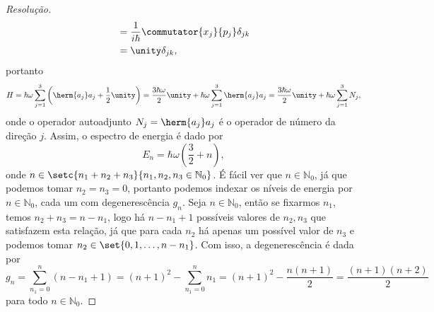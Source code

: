 \begin{proof}[Resolução]
\begin{align*}
                                     &= \frac{1}{i\hbar} \commutator{x_j}{p_j} \delta_{jk}\\
                                     &= \unity \delta_{jk},
    \end{align*}
    portanto
    \begin{equation*}
        H = \hbar \omega \sum_{j= 1}^3 \left(\herm{a_j}a_j + \frac12 \unity\right) = \frac{3 \hbar \omega}{2} \unity + \hbar \omega \sum_{j= 1}^3 \herm{a_j}a_j = \frac{3\hbar \omega}{2} \unity + \hbar\omega \sum_{j= 1}^3 N_j,
    \end{equation*}
    onde o operador autoadjunto \(N_j = \herm{a_j}a_j\) é o operador de número da direção \(j\). Assim, o espectro de energia é dado por
    \begin{equation*}
        E_n = \hbar \omega \left(\frac32 + n\right),
    \end{equation*}
    onde \(n \in \setc{n_1 + n_2 + n_3}{n_1, n_2, n_3 \in \mathbb{N}_0}\). É fácil ver que \(n \in \mathbb{N}_0\), já que podemos tomar \(n_2 = n_3 = 0\), portanto podemos indexar os níveis de energia por \(n \in \mathbb{N}_0\), cada um com degenerescência \(g_n\). Seja \(n \in \mathbb{N}_0\), então se fixarmos \(n_1\), temos \(n_2 + n_3 = n - n_1\), logo há \(n - n_1 + 1\) possíveis valores de \(n_2, n_3\) que satisfazem esta relação, já que para cada \(n_2\) há apenas um possível valor de \(n_3\) e podemos tomar \(n_2 \in \set{0, 1,\dots, n - n_1}\). Com isso, a degenerescência é dada por
    \begin{equation*}
        g_n = \sum_{n_1 = 0}^{n} (n - n_1 + 1) = (n + 1)^2 - \sum_{n_1 = 0}^n n_1 = (n+1)^2 - \frac{n(n+1)}{2} = \frac{(n+1)(n + 2)}{2}
    \end{equation*}
    para todo \(n \in \mathbb{N}_0\).


\end{proof}
